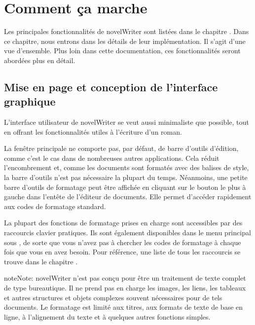 \documentclass[a4paper,11pt,french]{sphinxmanual}
\begin{document}
\sphinxstepscope


\chapter{Comment ça marche}
\label{\detokenize{usage_breakdown:how-it-works}}\label{\detokenize{usage_breakdown:a-breakdown}}\label{\detokenize{usage_breakdown::doc}}
\sphinxAtStartPar
Les principales fonctionnalités de novelWriter sont listées dans le chapitre {\hyperref[\detokenize{int_introduction:a-intro}]{}}. Dans ce chapitre, nous entrons dans les détails de leur implémentation. Il s’agit d’une vue d’ensemble. Plus loin dans cette documentation, ces fonctionnalités seront abordées plus en détail.


\section{Mise en page et conception de l’interface graphique}
\label{\detokenize{usage_breakdown:gui-layout-and-design}}\label{\detokenize{usage_breakdown:a-breakdown-design}}
\sphinxAtStartPar
L’interface utilisateur de novelWriter se veut aussi minimaliste que possible, tout en offrant les fonctionnalités utiles à l’écriture d’un roman.

\sphinxAtStartPar
La fenêtre principale ne comporte pas, par défaut, de barre d’outils d’édition, comme c’est le cas dans de nombreuses autres applications. Cela réduit l’encombrement et, comme les documents sont formatés avec des balises de style, la barre d’outils n’est pas nécessaire la plupart du temps. Néanmoins, une petite barre d’outils de formatage peut être affichée en cliquant sur le bouton le plus à gauche dans l’en\sphinxhyphen{}tête de l’éditeur de documents. Elle permet d’accéder rapidement aux codes de formatage standard.

\sphinxAtStartPar
La plupart des fonctions de formatage prises en charge sont accessibles par des raccourcis clavier pratiques. Ils sont également disponibles dans le menu principal sous , de sorte que vous n’avez pas à chercher les codes de formatage à chaque fois que vous en avez besoin. Pour référence, une liste de tous les raccourcis se trouve dans le chapitre {\hyperref[\detokenize{usage_shortcuts:a-kb}]{}}.

\begin{sphinxadmonition}{note}{Note:}
\sphinxAtStartPar
novelWriter n’est pas conçu pour être un traitement de texte complet de type bureautique. Il ne prend pas en charge les images, les liens, les tableaux et autres structures et objets complexes souvent nécessaires pour de tels documents. Le formatage est limité aux titres, aux formats de texte de base en ligne, à l’alignement du texte et à quelques autres fonctions simples.
\end{sphinxadmonition}
\end{document}
